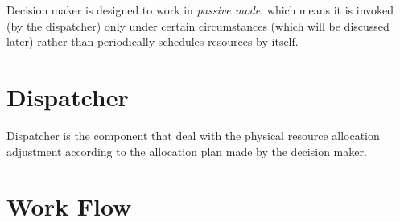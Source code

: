 Decision maker is designed to work in \emph{passive mode}, which means
it is invoked (by the dispatcher) only under certain circumstances
(which will be discussed later) rather than periodically schedules
resources by itself.

\section{Dispatcher}

Dispatcher is the component that deal with the physical resource
allocation adjustment according to the allocation plan made by the
decision maker.

\section{Work Flow}

